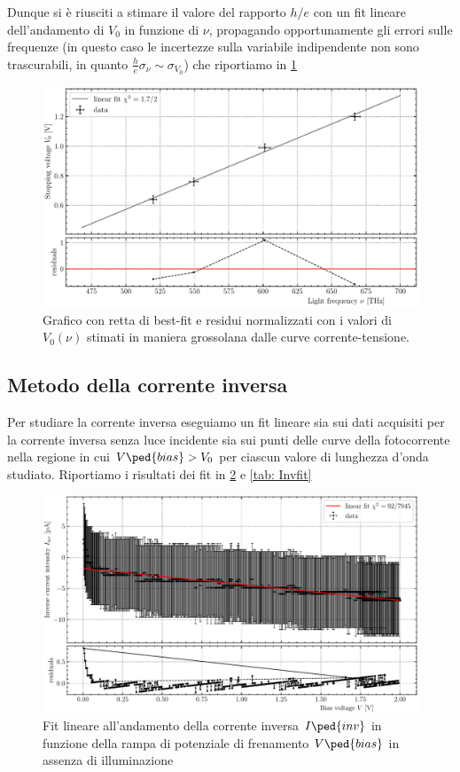 \documentclass[10pt, a4paper, italian]{article}
\begin{document}
Dunque si è riusciti a stimare il valore del rapporto $h/e$ con un fit
lineare dell'andamento di $V_0$ in funzione di $\nu$, propagando
opportunamente gli errori sulle frequenze (in questo caso le incertezze sulla
variabile indipendente non sono trascurabili, in quanto
$\frac{h}{e} \sigma_\nu \sim \sigma_{V_0}$) che riportiamo in
\cref{fig: heprel}
\begin{figure}[htbp]
    \centering
	\includegraphics[width=\textwidth]{heprel}
    \caption{Grafico con retta di best-fit e residui normalizzati con i valori
    di $V_0(\nu)$ stimati in maniera grossolana dalle curve corrente-tensione.
    \label{fig: heprel}}
\end{figure}

\subsection{Metodo della corrente inversa}
Per studiare la corrente inversa eseguiamo un fit lineare sia sui dati
acquisiti per la corrente inversa senza luce incidente sia sui punti delle
curve della fotocorrente nella regione in cui $V\ped{bias} > V_0$ per ciascun
valore di lunghezza d'onda studiato.
Riportiamo i risultati dei fit in \cref{fig: darkfit} e \cref{tab: Invfit}
\begin{figure}[htbp]
    \centering
	\includegraphics[width=\textwidth]{darkfit}
    \caption{Fit lineare all'andamento della corrente inversa $I\ped{inv}$ in
    funzione della rampa di potenziale di frenamento $V\ped{bias}$ in assenza
    di illuminazione
    \label{fig: darkfit}}
\end{figure}
\end{document}
